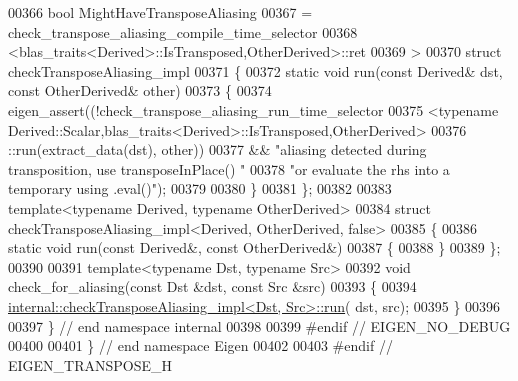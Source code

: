 \begin{DoxyCode}
00366          \textcolor{keywordtype}{bool} MightHaveTransposeAliasing
00367                  = check\_transpose\_aliasing\_compile\_time\_selector
00368                      <blas\_traits<Derived>::IsTransposed,OtherDerived>::ret
00369         >
00370 \textcolor{keyword}{struct }checkTransposeAliasing\_impl
00371 \{
00372     \textcolor{keyword}{static} \textcolor{keywordtype}{void} run(\textcolor{keyword}{const} Derived& dst, \textcolor{keyword}{const} OtherDerived& other)
00373     \{
00374         eigen\_assert((!check\_transpose\_aliasing\_run\_time\_selector
00375                       <\textcolor{keyword}{typename} Derived::Scalar,blas\_traits<Derived>::IsTransposed,OtherDerived>
00376                       ::run(extract\_data(dst), other))
00377           && \textcolor{stringliteral}{"aliasing detected during transposition, use transposeInPlace() "}
00378              \textcolor{stringliteral}{"or evaluate the rhs into a temporary using .eval()"});
00379 
00380     \}
00381 \};
00382 
00383 \textcolor{keyword}{template}<\textcolor{keyword}{typename} Derived, \textcolor{keyword}{typename} OtherDerived>
00384 \textcolor{keyword}{struct }checkTransposeAliasing\_impl<Derived, OtherDerived, false>
00385 \{
00386     \textcolor{keyword}{static} \textcolor{keywordtype}{void} run(\textcolor{keyword}{const} Derived&, \textcolor{keyword}{const} OtherDerived&)
00387     \{
00388     \}
00389 \};
00390 
00391 \textcolor{keyword}{template}<\textcolor{keyword}{typename} Dst, \textcolor{keyword}{typename} Src>
00392 \textcolor{keywordtype}{void} check\_for\_aliasing(\textcolor{keyword}{const} Dst &dst, \textcolor{keyword}{const} Src &src)
00393 \{
00394   \hyperlink{struct_eigen_1_1internal_1_1check_transpose_aliasing__impl}{internal::checkTransposeAliasing\_impl<Dst, Src>::run}(
      dst, src);
00395 \}
00396 
00397 \} \textcolor{comment}{// end namespace internal}
00398 
00399 \textcolor{preprocessor}{#endif // EIGEN\_NO\_DEBUG}
00400 
00401 \} \textcolor{comment}{// end namespace Eigen}
00402 
00403 \textcolor{preprocessor}{#endif // EIGEN\_TRANSPOSE\_H}
\end{DoxyCode}
